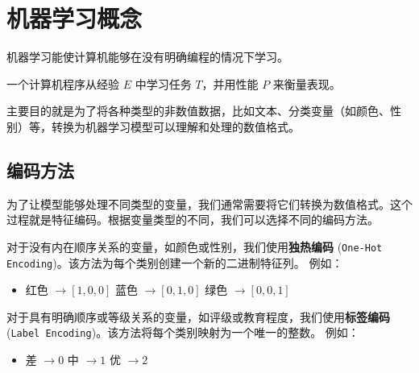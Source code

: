 \section{机器学习概念}

\begin{definition}[机器学习]
    机器学习能使计算机能够在没有明确编程的情况下学习。

    一个计算机程序从经验 $E$ 中学习任务 $T$，并用性能 $P$ 来衡量表现。
\end{definition}

\begin{definition}[特征编码]
    主要目的就是为了将各种类型的非数值数据，比如文本、分类变量（如颜色、性别）等，转换为机器学习模型可以理解和处理的数值格式。
\end{definition}

\subsection{编码方法}

\begin{definition}[编码方法]
    为了让模型能够处理不同类型的变量，我们通常需要将它们转换为数值格式。这个过程就是特征编码。根据变量类型的不同，我们可以选择不同的编码方法。
\end{definition}

\begin{example}[无序类别变量的独热编码]
    对于没有内在顺序关系的变量，如颜色或性别，我们使用\textbf{独热编码} (\texttt{One-Hot Encoding})。该方法为每个类别创建一个新的二进制特征列。
    例如：
    \begin{center}
        \begin{itemize}
            \item 红色 $\rightarrow [1, 0, 0]$ \quad \quad 蓝色 $\rightarrow [0, 1, 0]$ \quad \quad 绿色 $\rightarrow [0, 0, 1]$
        \end{itemize}
    \end{center}
\end{example}

\begin{example}[有序类别变量的标签编码]
    对于具有明确顺序或等级关系的变量，如评级或教育程度，我们使用\textbf{标签编码} (\texttt{Label Encoding})。该方法将每个类别映射为一个唯一的整数。
    例如：
    \begin{center}
        \begin{itemize}
            \item 差 $\rightarrow 0$ \quad \quad 中 $\rightarrow 1$ \quad \quad 优 $\rightarrow 2$
        \end{itemize}
    \end{center}
\end{example}


